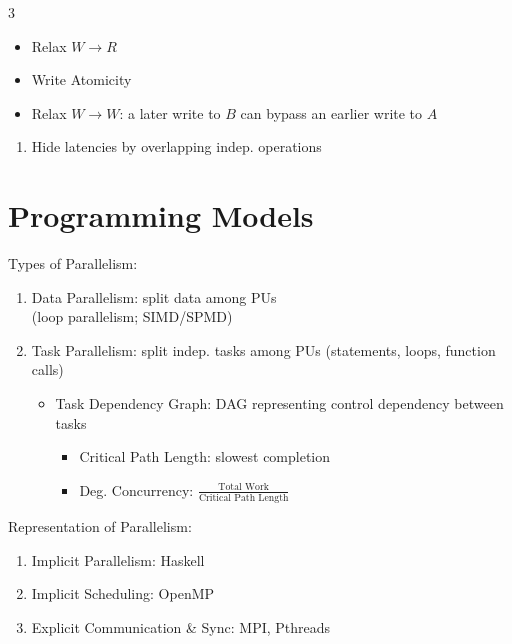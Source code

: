 \documentclass[12pt, a4paper]{article}
\begin{document}
\begin{multicols*}{3}
\begin{enumerate}[\roman*.]
    \begin{itemize}[leftmargin=*]\vspace{3pt}
      \item Relax $W\rightarrow R$
      \item Write Atomicity
      \item Relax $W\rightarrow W$: a later write to $B$ can bypass an earlier write to $A$
    \end{itemize}
\end{enumerate}
\begin{enumerate}[$+$]\vspace{-2pt }
  \item Hide latencies by overlapping indep. operations
\end{enumerate}
\vspace{-1em}
\colbreak
\section{Programming Models}

Types of Parallelism:
\begin{enumerate}[\roman*.]
  \item Data Parallelism: split data among PUs\\(loop parallelism; SIMD/SPMD)
  \item Task Parallelism: split indep. tasks among PUs (statements, loops, function calls)
    \begin{itemize}[leftmargin=*]\vspace{3pt}
      \item Task Dependency Graph: DAG representing control dependency between tasks
        \begin{itemize}[leftmargin=*]\vspace{3pt}
          \item Critical Path Length: slowest completion
          \item Deg. Concurrency: $\displaystyle \frac{\text{Total Work}}{\text{Critical Path Length}}$
        \end{itemize}
    \end{itemize}
\end{enumerate}

Representation of Parallelism:
\begin{enumerate}[\roman*.]
  \item Implicit Parallelism: Haskell
  \item Implicit Scheduling: OpenMP
  \item Explicit Communication \& Sync: MPI, Pthreads
\end{enumerate}


\end{multicols*}
\end{document}
